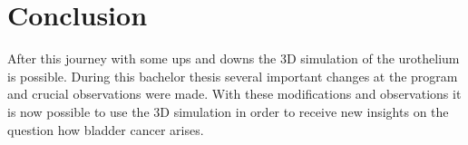 \chapter{Conclusion}
After this journey with some ups and downs the 3D simulation of the urothelium is possible. During this bachelor thesis several important changes at the program and crucial observations were made. With these modifications and observations it is now possible to use the 3D simulation in order to receive new insights on the question how bladder cancer arises.